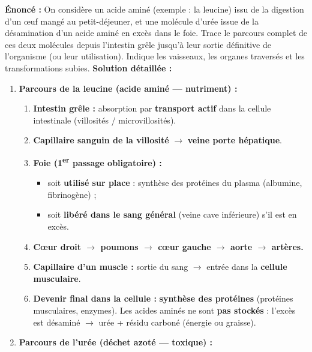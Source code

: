 \documentclass[11pt]{article}
\begin{document}
\begin{exoresolu}
    \textbf{Énoncé :} On considère un acide aminé (exemple : la leucine) issu de la digestion d'un œuf mangé au petit-déjeuner, et une molécule d'urée issue de la désamination d'un acide aminé en excès dans le foie. Trace le parcours complet de ces deux molécules depuis l'intestin grêle jusqu'à leur sortie définitive de l'organisme (ou leur utilisation). Indique les vaisseaux, les organes traversés et les transformations subies.
    \tcblower
    \textbf{Solution détaillée :}
    \begin{enumerate}
        \item \textbf{Parcours de la leucine (acide aminé — nutriment) :}
            \begin{enumerate}
                \item \textbf{Intestin grêle :} absorption par \textbf{transport actif} dans la cellule intestinale (villosités / microvillosités).
                \item \textbf{Capillaire sanguin de la villosité} $\rightarrow$ \textbf{veine porte hépatique}.
                \item \textbf{Foie (1\textsuperscript{er} passage obligatoire) :}
                    \begin{itemize}
                        \item soit \textbf{utilisé sur place} : synthèse des protéines du plasma (albumine, fibrinogène) ;
                        \item soit \textbf{libéré dans le sang général} (veine cave inférieure) s'il est en excès.
                    \end{itemize}
                \item \textbf{Cœur droit $\rightarrow$ poumons $\rightarrow$ cœur gauche $\rightarrow$ aorte $\rightarrow$ artères.}
                \item \textbf{Capillaire d'un muscle :} sortie du sang $\rightarrow$ entrée dans la \textbf{cellule musculaire}.
                \item \textbf{Devenir final dans la cellule :} \textbf{synthèse des protéines} (protéines musculaires, enzymes). Les acides aminés ne sont \textbf{pas stockés} : l'excès est désaminé $\rightarrow$ urée + résidu carboné (énergie ou graisse).
            \end{enumerate}
        \item \textbf{Parcours de l'urée (déchet azoté — toxique) :}
            \begin{enumerate}

\end{enumerate}
\end{enumerate}
\end{exoresolu}
\end{document}
